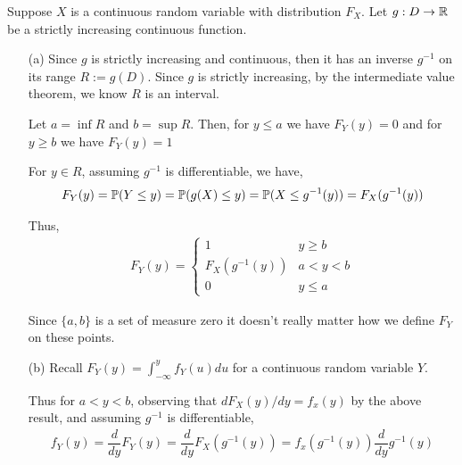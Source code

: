 \documentclass[10pt]{article}
\begin{document}
\begin{solution}[Solution]
Suppose \( X \) is a continuous random variable with distribution \( F_X \). Let \( g:D\to \mathbb{R} \) be a strictly increasing continuous function.


\begin{enumerate}
    \item[(a)] Since \( g \) is strictly increasing and continuous, then it has an inverse \( g^{-1} \) on its range \( R:=g(D) \). Since \( g \) is strictly increasing, by the intermediate value theorem, we know \( R \) is an interval.

        Let \( a=\inf{R} \) and \( b=\sup{R} \). Then, for \( y\leq a \) we have \( F_Y(y) = 0 \) and for \( y \geq b \) we have \( F_Y(y) = 1 \)
       
        For \( y\in R \), assuming \( g^{-1} \) is differentiable, we have, 
        \begin{align*}
            F_Y(y) = \mathbb{P}(Y\leq y) = \mathbb{P}(g(X)\leq y) = \mathbb{P}(X\leq g^{-1}(y)) = F_X(g^{-1}(y))
        \end{align*}

        Thus,
        \begin{align*}
            F_Y(y) = 
            \begin{cases}
                1 & y \geq b \\
                F_X(g^{-1}(y)) & a<y<b \\
                0 & y\leq a
            \end{cases}
        \end{align*}

        Since \( \{a,b\} \) is a set of measure zero it doesn't really matter how we define \( F_Y \) on these points. 


    \item[(b)] Recall \( F_Y(y) = \int_{-\infty}^{y}f_Y(u)du \) for a continuous random variable \( Y \).

        Thus for \( a<y<b \), observing that \( dF_X(y)/dy = f_x(y) \) by the above result, and assuming \( g^{-1} \) is differentiable,
        \begin{align*}
            f_Y(y) = \dfrac{d}{dy}F_Y(y) = \dfrac{d}{dy}F_X(g^{-1}(y)) = f_x(g^{-1}(y)) \dfrac{d}{dy}g^{-1}(y)   
        \end{align*}


\end{enumerate}
\end{solution}
\end{document}
